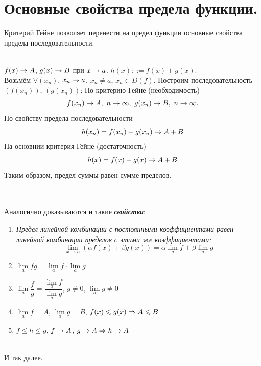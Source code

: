 \section{Основные свойства предела функции.}
Критерий Гейне позволяет перенести на предел функции основные свойства предела последовательности.\\
\begin{example}\\
	$f(x)\rightarrow A$, $g(x)\rightarrow B$ при $x\rightarrow a$.
	$h(x)::=f(x)+g(x)$.\\
	Возьмём $\forall(x_n)$, $x_n\rightarrow a$, $x_n\neq a$, $x_n\in D(f)$. Построим последовательность $(f(x_n))$, $(g(x_n))$:
	По критерию Гейне (необходимость)
	$$f(x_n)\rightarrow A,\ n\rightarrow \infty,\ g(x_n)\rightarrow B,\ n\rightarrow\infty.$$
	По свойству предела последовательности\\
	$$h(x_n)=f(x_n)+g(x_n)\rightarrow A+B$$
	На основнии критерия Гейне (достаточность)\\
	$$h(x) = f(x) + g(x)\rightarrow A+B$$
	Таким образом, предел суммы равен сумме пределов.
\end{example}\\\\
Аналогично доказываются и такие \textit{\textbf{свойства}}:
\begin{enumerate}
	\item \textit{Предел линейной комбинации с постоянными коэффициентами равен линейной комбинации пределов с этими же коэффициентами:}
	$$\lim\limits_{x\to a}(\alpha f(x) + \beta g(x)) = \alpha\lim\limits_a f + \beta\lim\limits_a g$$
	\item $\lim\limits_a fg = \lim\limits_a f\cdot\lim\limits_a g$
	\item $\lim\limits_a\dfrac{f}{g} = \dfrac{\lim\limits_a f}{\lim\limits_a g}$, $g\neq0$, $\lim\limits_a g\neq0$
	\item $\lim\limits_a f = A$, $\lim\limits_a g = B$, $f(x)\leqslant g(x)\Rightarrow A\leqslant B$
	\item $f\leqslant h\leqslant g$, $f\rightarrow A$, $g\rightarrow A\Rightarrow h\rightarrow A$\\\\
\end{enumerate}
И так далее.

